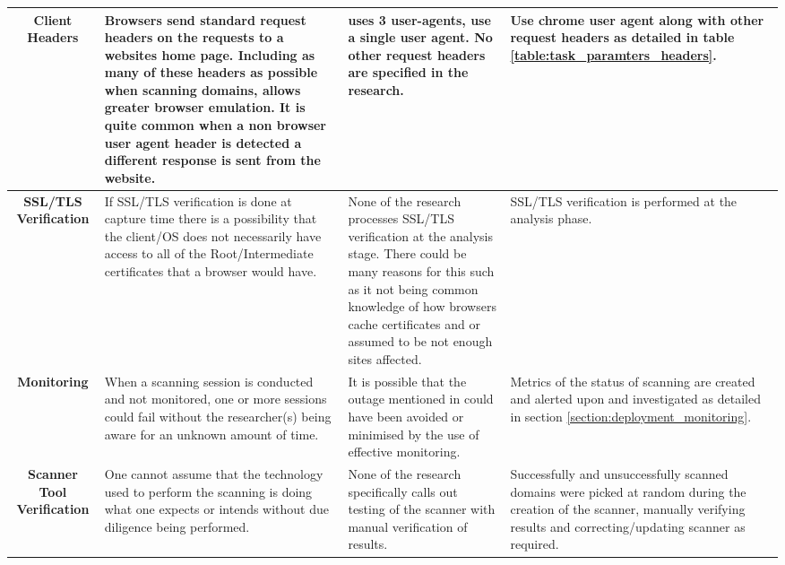 \documentclass{mscreport}
\begin{document}
\begin{center}
\begin{longtable}{|C|E|H|H|}
      \textbf{Client Headers} & Browsers send standard request headers on the requests to a websites home page. Including as many of these headers as possible when scanning domains, allows greater browser emulation. It is quite common when a non browser user agent header is detected a different response is sent from the website. & \cite{Patil2017-bg} uses 3 user-agents, \cite{Buchanan2018-xz,Amann2017-co,Kotzias2018-wd,Poteat2021-zr,Van_Goethem2014-ao,Chen2016-dl,Kumar2017-qw,Michael2015-hn} use a single user agent. No other request headers are specified in the research. & Use chrome user agent along with other request headers as detailed in table \ref{table:task_paramters_headers}. \\
      \hline
      \textbf{SSL/TLS Verification} & If SSL/TLS verification is done at capture time there is a possibility that the client/OS does not necessarily have access to all of the Root/Intermediate certificates that a browser would have. & None of the research \cite{Patil2017-bg,Buchanan2018-xz,Amann2017-co,Kotzias2018-wd,Poteat2021-zr,Roth2020-hg,Van_Goethem2014-ao,Chen2016-dl,Kumar2017-qw,Calzavara2018-xv,Holz2020-ha,Michael2015-hn,} processes SSL/TLS verification at the analysis stage. There could be many reasons for this such as it not being common knowledge of how browsers cache certificates and or assumed to be not enough sites affected. & SSL/TLS verification is performed at the analysis phase. \\
      \hline
      \textbf{Monitoring} & When a scanning session is conducted and not monitored, one or more sessions could fail without the researcher(s) being aware for an unknown amount of time. & It is possible that the outage mentioned in \cite{Poteat2021-zr} could have been avoided or minimised by the use of effective monitoring. & Metrics of the status of scanning are created and alerted upon and investigated as detailed in section \ref{section:deployment_monitoring}. \\
      \hline
      \textbf{Scanner Tool Verification} & One cannot assume that the technology used to perform the scanning is doing what one expects or intends without due diligence being performed. & None of the research specifically calls out testing of the scanner with manual verification of results. & Successfully and unsuccessfully scanned domains were picked at random during the creation of the scanner, manually verifying results and correcting/updating scanner as required. \\

\end{longtable}
\end{center}
\end{document}
